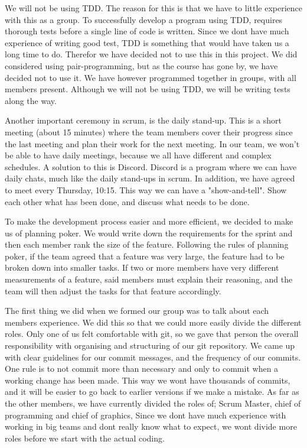 \documentclass{article}
\begin{document}
We will not be using TDD. The reason for this is that we have to little experience with this as a group. To successfully develop a program using TDD, requires thorough tests before a single line of code is written. Since we dont have much experience of writing good test, TDD is something that would have taken us a long time to do. Therefor we have decided not to use this in this project. We did considered using pair-programming, but as the course has gone by, we have decided not to use it. We have however programmed together in groups, with all members present. Although we will not be using TDD, we will be writing tests along the way.
\newline

Another important ceremony in scrum, is the daily stand-up. This is a short meeting (about 15 minutes) where the team members cover their progress since the last meeting and plan their work for the next meeting. In our team, we won't be able to have daily meetings, because we all have different and complex schedules. A solution to this is Discord. Discord is a program where we can have daily chats, much like the daily stand-ups in scrum. In addition, we have agreed to meet every Thursday, 10:15. This way we can have a "show-and-tell". Show each other what has been done, and discuss what needs to be done.
\newline

To make the development process easier and more efficient, we decided to make us of planning poker. We would write down the requirements for the sprint and then each member rank the size of the feature. Following the rules of planning poker, if the team agreed that a feature was very large, the feature had to be broken down into smaller tasks. If two or more members have very different measurements of a feature, said members must explain their reasoning, and the team will then adjust the tasks for that feature accordingly.\newline

The first thing we did when we formed our group was to talk about each members experience. We did this so that we could more easily divide the different roles. Only one of us felt comfortable with git, so we gave that person the overall responsibility with organising and structuring of our git repository. We came up with clear guidelines for our commit messages, and the frequency of our commits. One rule is to not commit more than necessary and only to commit when a working change has been made. This way we wont have thousands of commits, and it will be easier to go back to earlier versions if we make a mistake. As far as the other members, we have currently divided the roles of; Scrum Master, chief of programming and chief of graphics, Since we dont have much experience with working in big teams and dont really know what to expect, we wont divide more roles before we start with the actual coding. \newline
\end{document}
